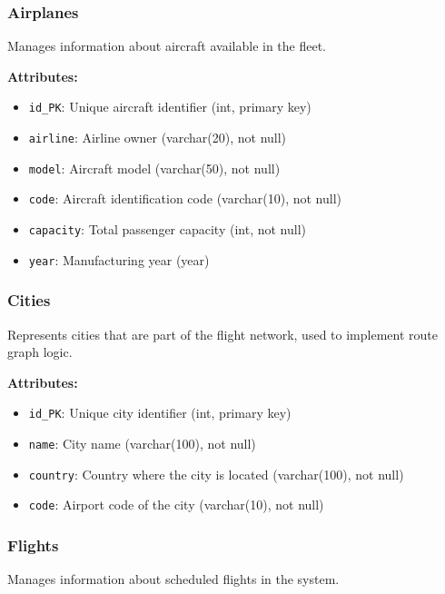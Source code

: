 \documentclass[conference]{IEEEtran}
\begin{document}
    \subsubsection{Airplanes}
    Manages information about aircraft available in the fleet.

    \textbf{Attributes:}
    \begin{itemize}
        \item \texttt{id\_PK}: Unique aircraft identifier (int, primary key)
        \item \texttt{airline}: Airline owner (varchar(20), not null)
        \item \texttt{model}: Aircraft model (varchar(50), not null)
        \item \texttt{code}: Aircraft identification code (varchar(10), not null)
        \item \texttt{capacity}: Total passenger capacity (int, not null)
        \item \texttt{year}: Manufacturing year (year)
    \end{itemize}

    \subsubsection{Cities}
    Represents cities that are part of the flight network, used to implement route graph logic.

    \textbf{Attributes:}
    \begin{itemize}
        \item \texttt{id\_PK}: Unique city identifier (int, primary key)
        \item \texttt{name}: City name (varchar(100), not null)
        \item \texttt{country}: Country where the city is located (varchar(100), not null)
        \item \texttt{code}: Airport code of the city (varchar(10), not null)
    \end{itemize}

    \subsubsection{Flights}
    Manages information about scheduled flights in the system.
\end{document}
